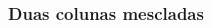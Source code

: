 \documentclass[aspectratio=169]{beamer}
\begin{document}
\begin{frame}[fragile] \frametitle{Duas colunas mescladas}
\vspace{-2em}
\begin{columns}[t]
\begin{column}{0.64\linewidth}
  \begin{exampleblock}{}
  \end{exampleblock}
  \begin{columns}[t]
  \begin{column}{0.48\linewidth}
    \begin{block}{\lipsum[2][12]}
      \lipsum[3][1]
    \end{block}
  \end{column}
  \begin{column}{0.48\linewidth}
    \begin{block}{\lipsum[3][2]}
      \lipsum[3][3]
    \end{block}
  \end{column}
  \end{columns}
\end{column}
\begin{column}{0.32\linewidth}
  \begin{block}{\lipsum[3][4]}
    \lipsum[3][5-9]
  \end{block}
\end{column}
\end{columns}
\end{frame}

\end{document}
